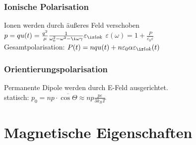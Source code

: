 \documentclass[fs, footer]{latex4ei}
\begin{document}
\begin{multicols*}{4}
{	
	
	\subsubsection*{Ionische Polarisation} Ionen werden durch äußeres Feld verschoben\\
	$p = q u(t) = \frac{q^2}{\mu}\frac{1}{\omega_0^2-\omega^2-\i\omega\gamma} \varepsilon_{\ir lok}$ \qquad $\varepsilon(\omega) = 1 + \frac{P}{\varepsilon_0\varepsilon}$\\
	Gesamtpolarisation: $P(t) = nqu(t)+n\varepsilon_0\alpha\varepsilon_{\ir lok}(t)$\\
	\subsubsection*{Orientierungspolarisation} Permanente Dipole werden durch E-Feld ausgerichtet.\\
	statisch: $p_0=np\cdot \overline{\cos\Theta} \approx np \frac{p\varepsilon}{3k_BT}$
}

\section{Magnetische Eigenschaften}
	

\end{multicols*}
\end{document}
